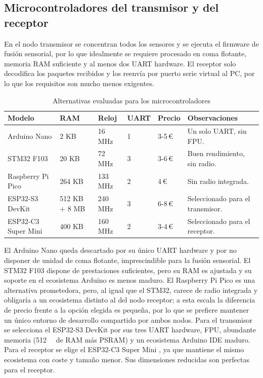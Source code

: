 \subsection{Microcontroladores del transmisor y del receptor}
\label{sec:sel_mcu}

En el nodo transmisor se concentran todos los sensores y se ejecuta el firmware de fusión sensorial, por lo que idealmente se requiere procesado en coma flotante, memoria RAM suficiente y al menos dos UART hardware. El receptor solo
decodifica los paquetes recibidos y los reenvía por puerto serie virtual al
PC, por lo que los requisitos son mucho menos exigentes.

\begin{table}[H]
    \centering
    \caption{Alternativas evaluadas para los microcontroladores}
    \label{tab:sel_mcu}
    \footnotesize
    \begin{tabularx}{\linewidth}{L{2.1cm} C{1.2cm} C{1.3cm} C{0.7cm} C{1.4cm} X}
        \toprule
        \textbf{Modelo} & \textbf{RAM} & \textbf{Reloj} & \textbf{UART} & \textbf{Precio} & \textbf{Observaciones} \\
        \midrule
        Arduino Nano & 2 KB & 16 MHz & 1 & 3-5\,\euro{} & Un solo UART, sin FPU. \\
        STM32 F103 & 20 KB & 72 MHz & 3 & 3-6\,\euro{} & Buen rendimiento, sin radio. \\
        Raspberry Pi Pico & 264 KB & 133 MHz & 2 & 4\,\euro{} & Sin radio integrada. \\
        ESP32-S3 DevKit & 512 KB + 8 MB & 240 MHz & 3 & 6-8\,\euro{} & Seleccionado para el transmisor. \\
        ESP32-C3 Super Mini & 400 KB & 160 MHz & 2 & 3-4\,\euro{} & Seleccionado para el receptor. \\
        \bottomrule
    \end{tabularx}
\end{table}

El Arduino Nano queda descartado por su único UART hardware y por no
disponer de unidad de coma flotante, imprescindible para la fusión
sensorial. El STM32 F103 dispone de prestaciones suficientes, pero su RAM
es ajustada y su soporte en el ecosistema Arduino es menos maduro. El
Raspberry Pi Pico es una alternativa prometedora, pero, al igual que el STM32, carece de radio integrada y obligaría a un ecosistema distinto al del nodo receptor; a esta escala la diferencia de precio frente a la opción elegida es pequeña, por lo que se prefiere mantener un único entorno de desarrollo compartido por ambos nodos. Para el transmisor se
selecciona el ESP32-S3 DevKit \cite{ds_esp32s3} por sus tres
UART hardware, FPU, abundante memoria (\SI{512}{\kilo\byte} de RAM más
PSRAM) y un ecosistema Arduino IDE maduro. Para el receptor se elige el ESP32-C3 Super Mini \cite{ds_esp32c3}, ya que mantiene el mismo ecosistema con coste y tamaño menor. Sus dimensiones reducidas son perfectas para el receptor.

